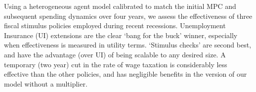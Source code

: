 \documentclass[../HAFiscal]{subfiles}
\begin{document}
Using a heterogeneous agent model calibrated to match the initial MPC and subsequent spending dynamics over four years, we assess the effectiveness of three fiscal stimulus policies employed during recent recessions.  Unemployment Insurance (UI) extensions are the clear `bang for the buck' winner, especially when effectiveness is measured in utility terms.  `Stimulus checks' are second best, and have the advantage (over UI) of being scalable to any desired size.  A temporary (two year) cut in the rate of wage taxation is considerably less effective than the other policies, and has negligible benefits in the version of our model without a multiplier.
\end{document}
